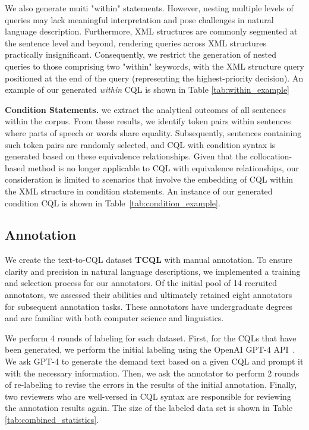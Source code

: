 \documentclass[11pt]{article}
\begin{document}
\begin{CJK*}{UTF8}{gbsn}
We also generate muiti "within" statements. However, nesting multiple levels of queries may lack meaningful interpretation and pose challenges in natural language description. Furthermore, XML structures are commonly segmented at the sentence level and beyond, rendering queries across XML structures practically insignificant. Consequently, we restrict the generation of nested queries to those comprising two "within" keywords, with the XML structure query positioned at the end of the query (representing the highest-priority decision). An example of our generated \emph{within} CQL is shown in Table \ref{tab:within_example}




\textbf{Condition Statements. }
we extract the analytical outcomes of all sentences within the corpus. From these results, we identify token pairs within sentences where parts of speech or words share equality. Subsequently, sentences containing such token pairs are randomly selected, and CQL with condition syntax is generated based on these equivalence relationships. Given that the collocation-based method is no longer applicable to CQL with equivalence relationships, our consideration is limited to scenarios that involve the embedding of CQL within the XML structure in condition statements. An instance of our generated condition CQL is shown in Table~\ref{tab:condition_example}.


\subsection{Annotation}

We create the text-to-CQL dataset \textbf{TCQL} with manual annotation. To ensure clarity and precision in natural language descriptions, we implemented a training and selection process for our annotators. Of the initial pool of 14 recruited annotators, we assessed their abilities and ultimately retained eight annotators for subsequent annotation tasks. These annotators have undergraduate degrees and are familiar with both computer science and linguistics.

We perform 4 rounds of labeling for each dataset. First, for the CQLs that have been generated, we perform the initial labeling using the OpenAI GPT-4 API~\citep{openai2023gpt4}. We ask GPT-4 to generate the demand text based on a given CQL and prompt it with the necessary information. Then, we ask the annotator to perform 2 rounds of re-labeling to revise the errors in the results of the initial annotation. Finally, two reviewers who are well-versed in CQL syntax are responsible for reviewing the annotation results again. The size of the labeled data set is shown in Table \ref{tab:combined_statistics}.


\end{CJK*}
\end{document}
